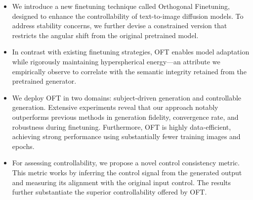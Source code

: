\begin{itemize}[leftmargin=*,nosep]
    \item We introduce a new finetuning technique called Orthogonal Finetuning, designed to enhance the controllability of text-to-image diffusion models. To address stability concerns, we further devise a constrained version that restricts the angular shift from the original pretrained model.
    \item In contrast with existing finetuning strategies, OFT enables model adaptation while rigorously maintaining hyperspherical energy—an attribute we empirically observe to correlate with the semantic integrity retained from the pretrained generator.
    \item We deploy OFT in two domains: subject-driven generation and controllable generation. Extensive experiments reveal that our approach notably outperforms previous methods in generation fidelity, convergence rate, and robustness during finetuning. Furthermore, OFT is highly data-efficient, achieving strong performance using substantially fewer training images and epochs.
    \item For assessing controllability, we propose a novel control consistency metric. This metric works by inferring the control signal from the generated output and measuring its alignment with the original input control. The results further substantiate the superior controllability offered by OFT.
\end{itemize}

